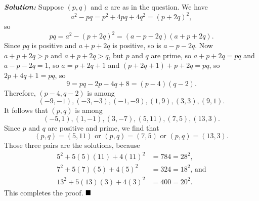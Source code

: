 \documentclass[12pt]{article}
\newcommand{\sol}{\textbf{\textit{Solution: }}}
\begin{document}
\begin{enumerate}[topsep=2\bigskipamount,itemsep=\bigskipamount]
\sol Suppose \((p, q)\) and \(a\) are as in the question. We have
\[a^{2} - pq = p^{2} + 4pq + 4q^{2} = (p + 2q)^{2},\]
so
\[pq = a^{2} - (p + 2q)^{2} = (a - p - 2q)(a + p + 2q).\]
Since \(pq\) is positive and \(a + p + 2q\) is positive, so is \(a - p - 2q\). Now \(a + p + 2q > p\) and \(a + p + 2q > q\), but \(p\) and \(q\) are prime, so \(a + p + 2q = pq\) and \(a - p - 2q = 1\), so \(a = p + 2q + 1\) and \((p + 2q + 1) + p + 2q = pq\), so \(2p + 4q + 1 = pq\), so
\[9 = pq - 2p - 4q + 8 = (p - 4)(q - 2).\]
Therefore, \((p - 4, q - 2)\) is among
\[(-9, -1), (-3, -3), (-1, -9), (1, 9), (3, 3), (9, 1).\]
It follows that \((p, q)\) is among
\[(-5, 1), (1, -1), (3, -7), (5, 11), (7, 5), (13, 3).\]
Since \(p\) and \(q\) are positive and prime, we find that
\[(p, q) = (5, 11) \textrm{ or } (p, q) = (7, 5) \textrm{ or } (p, q) = (13, 3).\]
Those three pairs are the solutions, because
\[\begin{aligned}
5^{2} + 5(5)(11) + 4(11)^{2} & = 784 = 28^{2},\\
7^{2} + 5(7)(5) + 4(5)^{2} & = 324 = 18^{2}\textrm{, and}\\
13^{2} + 5(13)(3) + 4(3)^{2} & = 400 = 20^{2}.
\end{aligned}\]
This completes the proof. $\hfill\blacksquare$
\end{enumerate}
\end{document}
